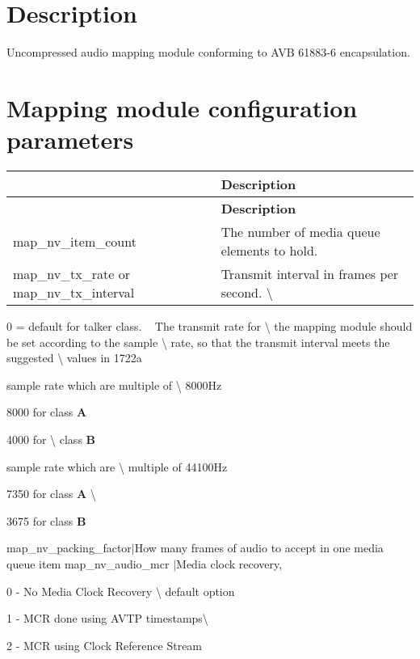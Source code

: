\section*{Description}

Uncompressed audio mapping module conforming to A\+VB 61883-\/6 encapsulation.

\section*{Mapping module configuration parameters}

\tabulinesep=1mm
\begin{longtabu} spread 0pt [c]{*2{|X[-1]}|}
\hline
{}&{\bf Description  }\\
\endfirsthead
\hline
\endfoot
\hline
{}&{\bf Description  }\\
\endhead
map\+\_\+nv\+\_\+item\+\_\+count &The number of media queue elements to hold. \\
map\+\_\+nv\+\_\+tx\+\_\+rate or map\+\_\+nv\+\_\+tx\+\_\+interval &Transmit interval in frames per second. \textbackslash{} \\
\end{longtabu}
0 = default for talker class. ~\newline
 The transmit rate for \textbackslash{} the mapping module should be set according to the sample \textbackslash{} rate, so that the transmit interval meets the suggested \textbackslash{} values in 1722a 
\begin{DoxyItemize}
\item sample rate which are multiple of \textbackslash{} 8000\+Hz 
\begin{DoxyItemize}
\item 8000 for class {\bfseries A}
\item 4000 for \textbackslash{} class {\bfseries B}
\end{DoxyItemize}
\item sample rate which are \textbackslash{} multiple of 44100\+Hz
\begin{DoxyItemize}
\item 7350 for class {\bfseries A} \textbackslash{} 
\item 3675 for class {\bfseries B}
\end{DoxyItemize}
\end{DoxyItemize}map\+\_\+nv\+\_\+packing\+\_\+factor$\vert$\+How many frames of audio to accept in one media queue item map\+\_\+nv\+\_\+audio\+\_\+mcr $\vert$\+Media clock recovery,
\begin{DoxyItemize}
\item 0 -\/ No Media Clock Recovery \textbackslash{} default option
\item 1 -\/ M\+CR done using A\+V\+TP timestamps\textbackslash{} 
\item 2 -\/ M\+CR using Clock Reference Stream
\end{DoxyItemize}

